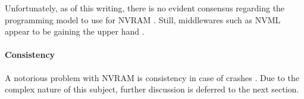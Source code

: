 Unfortunately, as of this writing, there is no evident consensus regarding the
programming model to use for \ac{NVRAM} \cite{boehm2016persistence}. Still,
middlewares such as NVML appear to be gaining the upper hand
\cite{oukid2017data, volos2017whisper, malinowski2017using, andrei2017sap}.

\paragraph{Consistency}

A notorious problem with \ac{NVRAM} is consistency in case of crashes
\cite{condit2009better, dulloor2014system, oukid2017data}. Due to the complex
nature of this subject, further discussion is deferred to the next section.

